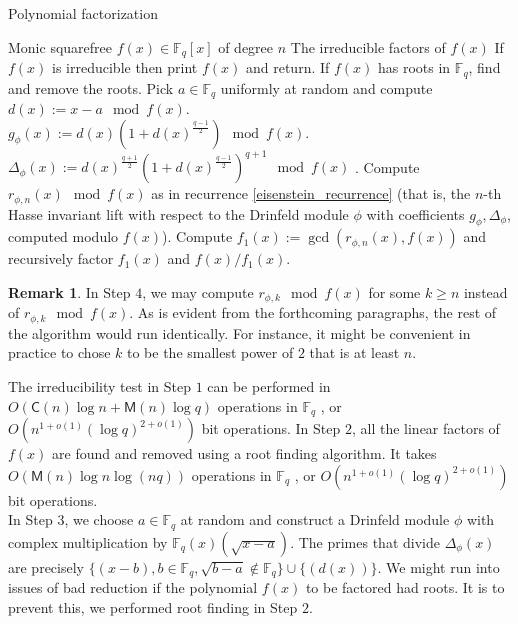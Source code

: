 \documentclass[12pt]{article}
\theoremstyle{plain}
\theoremstyle{definition}
\newtheorem*{remark}{Remark}
\def\F{\ensuremath{\mathbb{F}}}
\def\K{\ensuremath{\mathbb{K}}}
\def\MM{\ensuremath{\mathsf{M}}}
\def\CC{\ensuremath{\mathsf{C}}}
\newcommand{\D}{\Delta}
\begin{document}
\begin{algorithm}[H]
	\caption{Polynomial factorization}
	\label{factoring_algorithm}
	\begin{algorithmic}[1]
		\REQUIRE Monic squarefree $f(x) \in \F_q[x]$ of degree $n$
		\ENSURE The irreducible factors of $f(x)$
		\STATE If $f(x)$ is irreducible then print $f(x)$ and return.
		\STATE If $f(x)$ has roots in $\F_q$, find and remove the roots.
		\STATE Pick $a \in \F_q$ uniformly at random and compute \\ %
		$d(x) := x-a \mod f(x)$. \\
		$g_\phi(x) := d(x)(1+d(x)^{\frac{q-1}{2}}) \mod f(x)$. \\
		$\Delta_\phi(x) := d(x)^{\frac{q+1}{2}}(1+d(x)^{\frac{q-1}{2}})^{q+1} \mod f(x)$ .
		\STATE Compute $r_{\phi,n}(x) \mod f(x)$ as in recurrence \ref{eisenstein_recurrence} (that is, the $n$-th Hasse invariant lift with respect to the Drinfeld module $\phi$ with coefficients $g_\phi, \Delta_\phi$, computed modulo $f(x)$).
		\STATE Compute $f_1(x) := \gcd(r_{\phi,n}(x), f(x))$ and recursively factor $f_1(x)$ and $f(x)/f_1(x)$.
	\end{algorithmic}
\end{algorithm}

\begin{remark}
	In Step $4$, we may compute $r_{\phi,k} \mod f(x)$ for some $k\geq n$ instead of $r_{\phi,k} \mod f(x)$. As is evident from the forthcoming paragraphs, the rest of the algorithm would run identically. For instance, it might be convenient in practice to chose $k$ to be the smallest power of $2$ that is at least $n$.
\end{remark}


The irreducibility test in Step $1$ can be performed in $O(\CC(n)\log n + \MM(n)\log q)$ operations 
in $\F_q$ \cite{vzGG}, or $O(n^{1+o(1)} (\log q)^{2+o(1)})$ bit operations. In Step $2$, all the 
linear factors of $f(x)$ are found and removed using a root finding algorithm. It takes 
$O(\MM(n)\log n \log(nq))$ operations in $\F_q$ \cite{vzGG}, or $O(n^{1+o(1)} (\log q)^{2+o(1)})$ 
bit operations. \\

 In Step $3$, we choose $a \in \F_q$ at random and construct a Drinfeld module $\phi$ with complex 
 multiplication by $\F_q(x)(\sqrt{x-a})$. The primes that divide $\D_\phi(x)$ are precisely 
 $\{(x-b),  b \in \F_q, \sqrt{b-a} \notin \F_q\} \cup \{(d(x))\}$. We might run into issues of bad 
 reduction if the polynomial $f(x)$ to be factored had roots. It is to prevent this, we performed 
 root finding in Step $2$. \\
\end{document}
